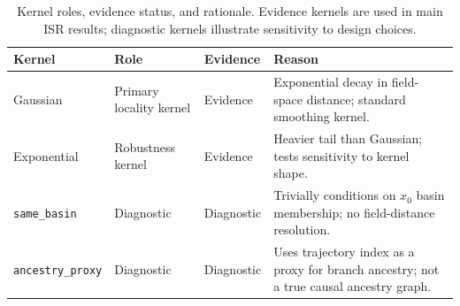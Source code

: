 \begin{table}[t]
  \centering
  \caption{Kernel roles, evidence status, and rationale. Evidence kernels are used in main ISR results; diagnostic kernels illustrate sensitivity to design choices.}
  \label{tab:kernel_roles}
  \begin{tabular}{lllp{5cm}}
    \toprule
    Kernel & Role & Evidence & Reason \\
    \midrule
    Gaussian & Primary locality kernel & Evidence & Exponential decay in field-space distance; standard smoothing kernel. \\
    Exponential & Robustness kernel & Evidence & Heavier tail than Gaussian; tests sensitivity to kernel shape. \\
    \texttt{same\_basin} & Diagnostic & Diagnostic & Trivially conditions on $x_0$ basin membership; no field-distance resolution. \\
    \texttt{ancestry\_proxy} & Diagnostic & Diagnostic & Uses trajectory index as a proxy for branch ancestry; not a true causal ancestry graph. \\
    \bottomrule
  \end{tabular}
\end{table}
